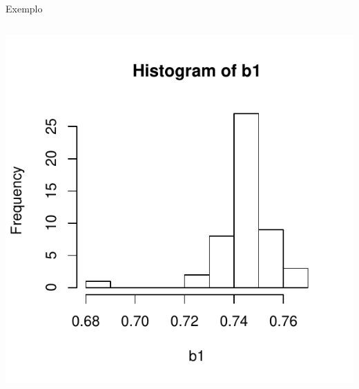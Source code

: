 \documentclass{beamer}\usepackage[]{graphicx}\usepackage[]{color}
\newenvironment{knitrout}{}{} %
\renewenvironment{knitrout}{\setlength{\topsep}{0mm}}{}
\begin{document}
\begin{frame}[fragile]{Exemplo}
\begin{columns}[c]
\begin{knitrout}
\includegraphics[width=.7\linewidth]{figure/v10-2} 

\end{knitrout}

\end{columns}

\end{frame}
\end{document}
